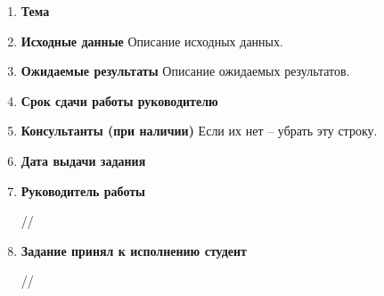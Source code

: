 \begin{enumerate}
	\item \textbf{Тема} \thema
	
	
	\item \textbf{Исходные данные} Описание исходных данных.
	
	\item \textbf{Ожидаемые результаты} Описание ожидаемых результатов.
	
	\item \textbf{Срок сдачи работы руководителю} \hspace{1cm} \datasdachi

	\item \textbf{Консультанты (при наличии)} Если их нет -- убрать эту строку.
	
		
	\item \textbf{Дата выдачи задания} \hspace{1cm}  \datavydachi
	
	\item \textbf{Руководитель работы}
		\begin{flushright}
			\underline{\hspace{4cm}} /\adviser/
		\end{flushright}
		
	\item \textbf{Задание принял к исполнению студент}
		\begin{flushright}
			\underline{\hspace{4cm}} /\student/
		\end{flushright}	
\end{enumerate}			
	
	